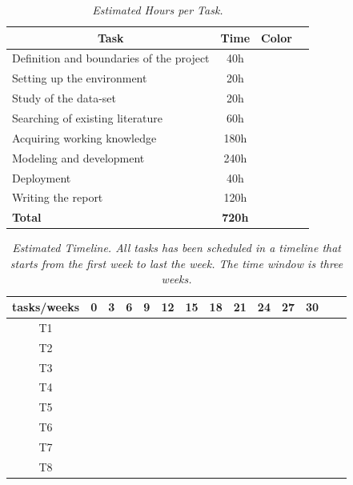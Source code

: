 \begin{table}[H]
\centering
\begin{tabular}{| l | c | c | c |}
\hline
\multicolumn{1}{|c|}{\textbf{Task}} & \multicolumn{1}{c|}{\textbf{Time}} & \multicolumn{1}{c|}{\textbf{Color}} \\
\hline
Definition and boundaries of the project & 40h & \cellcolor{red!50} \\
\hline
Setting up the environment & 20h & \cellcolor{lime!50} \\
\hline
Study of the data-set & 20h & \cellcolor{blue!40} \\
\hline
Searching of existing literature & 60h & \cellcolor{teal!50} \\
\hline
Acquiring working knowledge & 180h & \cellcolor{amber!30} \\
\hline
Modeling and development & 240h & \cellcolor{black!70} \\
\hline
Deployment & 40h & \cellcolor{gray!50} \\
\hline
Writing the report & 120h & \cellcolor{orange!50} \\
\hline
\textbf{Total} & \textbf{720h} & \\
\hline
\end{tabular}
\caption[Estimated Hours per Task.]{\textit{Estimated Hours per Task.}}
{\label{table:timeline_tasks}}
\end{table}

\begin{table}[H]
\centering
\label{tab:340W}
\begin{tabular}{| c | c | c | c |c | c | c |c | c | c |c | c | c |c | }
\hline 
tasks/weeks & 0 & 3 & 6 & 9 & 12 & 15 & 18 & 21 & 24 & 27 & 30 \\
\hline 
T1  & \cellcolor{red!50} &   &   &   &   &   &   &   &   &   &     \\
\hline
T2  &   & \cellcolor{lime!50}  &  &  &   &   &   &    &  &  &   \\
\hline
T3  &  &  & \cellcolor{blue!40} &  &   &   &   &   &  &  & \\
\hline
T4  &  &  &  & \cellcolor{teal!50} & \cellcolor{teal!50} &  &  &   &   &   &   \\
\hline
T5  &  &  &  &  & \cellcolor{amber!30} & \cellcolor{amber!30} & \cellcolor{amber!30}  & \cellcolor{amber!30} & \cellcolor{amber!30}  &  & \\
\hline
T6  &  &  &  &  & \cellcolor{black!70} & \cellcolor{black!70} & \cellcolor{black!70}  & \cellcolor{black!70} & \cellcolor{black!70}  &  \cellcolor{black!70} & \\
\hline
T7  &   &  &  &  &  &  &  &   &    & \cellcolor{gray!50} & \\
\hline
T8  &   &  &  &  &  & \cellcolor{orange!50}  &  &   &   & \cellcolor{orange!50} & \cellcolor{orange!50} \\
\hline
\end{tabular}
\caption[Estimated Timeline.] {\textit{Estimated Timeline. All tasks has been scheduled in a timeline that starts from the first week to last the week. The time window is three weeks.}}
\end{table}


